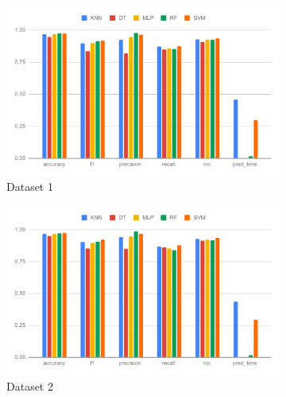 \begin{figure}[H]
    \begin{subfigure}{.5\columnwidth}
        \centering
        \includegraphics[width=0.9\columnwidth]{media/data/performance/perf_ds_1.pdf}
        \caption{Dataset 1}
        \label{fig:perfromance_results_dataset_1}
    \end{subfigure}%
    \begin{subfigure}{.5\columnwidth}
        \centering
        \includegraphics[width=0.9\columnwidth]{media/data/performance/perf_ds_2.pdf}
        \caption{Dataset 2}
        \label{fig:perfromance_results_dataset_2}
    \end{subfigure}\\%
    \begin{subfigure}{.5\columnwidth}

\end{subfigure}
\end{figure}
